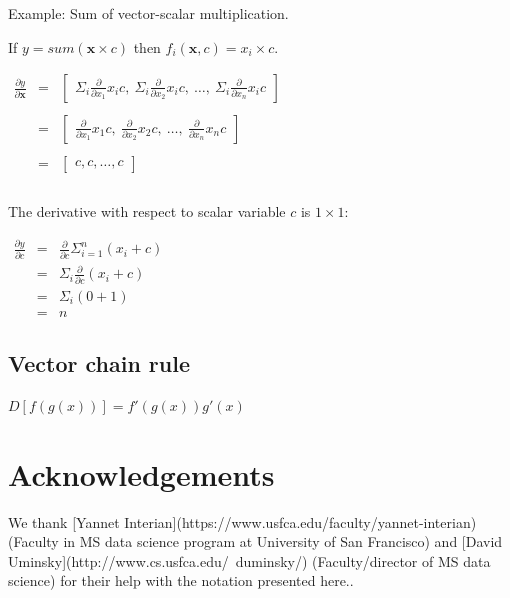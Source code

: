\documentclass[11pt]{article}
\begin{document}
Example: Sum of vector-scalar multiplication.


If $y = sum(\mathbf{x} \times c)$ then $f_i(\mathbf{x},c) = x_i \times c$.

$
\begin{array}{lcl}
\frac{\partial y}{\partial \mathbf{x}} & = & \begin{bmatrix} \Sigma_i \frac{\partial}{\partial x_1} x_i c,~ \Sigma_i \frac{\partial }{\partial x_2} x_i c,~ \ldots,~ \Sigma_i \frac{\partial}{\partial x_n} x_i c  \end{bmatrix}\\\\
 & = & \begin{bmatrix} \frac{\partial}{\partial x_1} x_1 c,~ \frac{\partial }{\partial x_2} x_2 c,~ \ldots,~ \frac{\partial}{\partial x_n} x_n c  \end{bmatrix}\\\\
 & = & \begin{bmatrix} c, c, \ldots, c \end{bmatrix}\\\\
\end{array}
$

The derivative with respect to scalar variable $c$ is $1 \times 1$:

$
\begin{array}{lcl}
\frac{\partial y}{\partial c} & = & \frac{\partial}{\partial c} \Sigma_{i=1}^n (x_i+c)\\
& = & \Sigma_i \frac{\partial}{\partial c} (x_i+c)\\
& = & \Sigma_i (0 + 1)\\
& = & n
\end{array}
$

\subsection{Vector chain rule}

$D[f(g(x))] = f'(g(x))g'(x)$

\section{Acknowledgements}

We thank [Yannet Interian](https://www.usfca.edu/faculty/yannet-interian) (Faculty in MS data science program at University of San Francisco) and [David Uminsky](http://www.cs.usfca.edu/~duminsky/) (Faculty/director of MS data science) for their help with the notation presented here..
\end{document}
